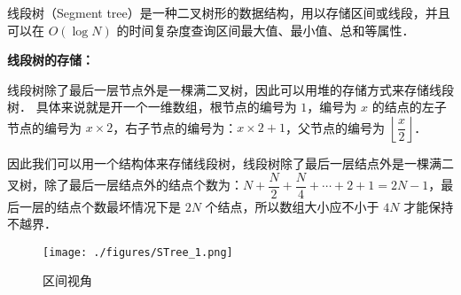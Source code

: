 
线段树（Segment tree）是一种二叉树形的数据结构，用以存储区间或线段，并且可以在 $O(\log N)$ 的时间复杂度查询区间最大值、最小值、总和等属性．

\textbf{线段树的存储：}

线段树除了最后一层节点外是一棵满二叉树，因此可以用堆的存储方式来存储线段树．
具体来说就是开一个一维数组，根节点的编号为 $1$，编号为 $x$ 的结点的左子节点的编号为 $x \times 2$，右子节点的编号为：$x \times 2 + 1$，父节点的编号为 $\left\lfloor\dfrac{x}{2}\right\rfloor$．

因此我们可以用一个结构体来存储线段树，线段树除了最后一层结点外是一棵满二叉树，除了最后一层结点外的结点个数为：$N + \dfrac{N}{2} + \dfrac{N}{4} + \cdots + 2 + 1 = 2N - 1$，最后一层的结点个数最坏情况下是 $2N$ 个结点，所以数组大小应不小于 $4N$ 才能保持不越界．

\begin{figure}[ht]
\centering
\texttt{[image: ./figures/STree\_1.png]}
\caption{区间视角} \label{STree_fig1}
\end{figure}

